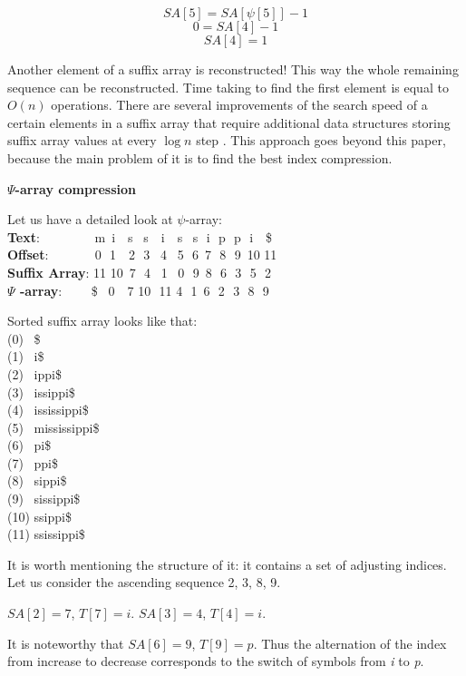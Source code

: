 \[SA[5] = SA[\psi[5]] - 1\]
\[0 = SA[4] - 1\]
\[SA[4] = 1\]

Another element of a suffix array is reconstructed!
This way the whole remaining sequence can be reconstructed.
Time taking to find the first element is equal to \(O(n)\) operations.
There are several improvements of the search speed of a certain elements in a suffix array
that require additional data structures storing suffix array values at every \(\log n\) step \cite{andersensimple}.
This approach goes beyond this paper, because the main problem of it is to find the best index compression.

\textbf{$\Psi$-array compression}

Let us have a detailed look at $\psi$-array:
\\ \textbf{Text}:\,\,\,\,\,\,\,\,\,\,\,\,\,\,\,\,\,\,\,\,\,\,\,\,
m \,i \,\,\,\,s \,\,\,s \,\,\,\,i \,\,\,\,s \,\,\,s \,\,i \,\,p \,\,p \,\,i \,\,\,\,\$
\\ \textbf{Offset}:\,\,\,\,\,\,\,\,\,\,\,\,\,\,\,\,\,\,\,\, 0 \,\,1 \,\,\,\,2
\,\,3 \,\,\,4 \,\,\,5 \,\,6 \,7 \,\,8 \,\,9 \,10 11
\\ \textbf{Suffix Array}:   11 10 \,7 \,\,4 \,\,\,1 \,\,\,0 \,\,9 \,8 \,\,6
\,\,3 \,\,5 \,\,2
\\ \textbf{$\Psi$ -array}: \,\,\,\,\,\,\,\,\,\,\,\,\$ \,\,\,0 \,\,\,\,7 10 \,\,11 4
\,\,1 \,6 \,\,2 \,\,3 \,\,8 \,\,9

Sorted suffix array looks like that:
\\ (0) \,\,\,\$
\\ (1) \,\,\,i\$
\\ (2) \,\,\,ippi\$
\\ (3) \,\,\,issippi\$
\\ (4) \,\,\,ississippi\$
\\ (5) \,\,\,mississippi\$
\\ (6) \,\,\,pi\$
\\ (7) \,\,\,ppi\$
\\ (8) \,\,\,sippi\$
\\ (9) \,\,\,sissippi\$
\\ (10) ssippi\$
\\ (11) ssissippi\$

It is worth mentioning the structure of it: it contains a set of adjusting indices.
Let us consider the ascending sequence 2, 3, 8, 9.

$SA[2] = 7$, $T[7] = i$.
$SA[3] = 4$, $T[4] = i$.

It is noteworthy that $SA[6] = 9$, $T[9] = p$.
Thus the alternation of the index from increase to decrease corresponds to
the switch of symbols from \emph{i} to \emph{p}.

